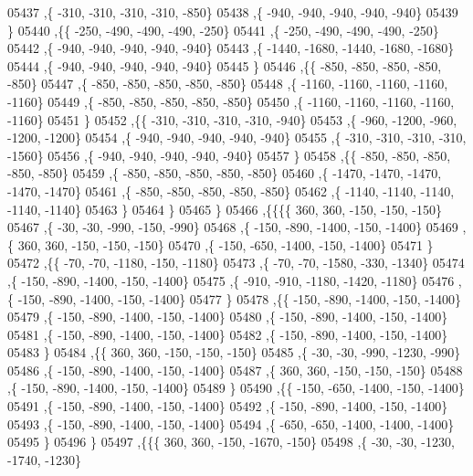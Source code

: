 \begin{DoxyCode}
05437     ,\{  -310,  -310,  -310,  -310,  -850\}
05438     ,\{  -940,  -940,  -940,  -940,  -940\}
05439     \}
05440    ,\{\{  -250,  -490,  -490,  -490,  -250\}
05441     ,\{  -250,  -490,  -490,  -490,  -250\}
05442     ,\{  -940,  -940,  -940,  -940,  -940\}
05443     ,\{ -1440, -1680, -1440, -1680, -1680\}
05444     ,\{  -940,  -940,  -940,  -940,  -940\}
05445     \}
05446    ,\{\{  -850,  -850,  -850,  -850,  -850\}
05447     ,\{  -850,  -850,  -850,  -850,  -850\}
05448     ,\{ -1160, -1160, -1160, -1160, -1160\}
05449     ,\{  -850,  -850,  -850,  -850,  -850\}
05450     ,\{ -1160, -1160, -1160, -1160, -1160\}
05451     \}
05452    ,\{\{  -310,  -310,  -310,  -310,  -940\}
05453     ,\{  -960, -1200,  -960, -1200, -1200\}
05454     ,\{  -940,  -940,  -940,  -940,  -940\}
05455     ,\{  -310,  -310,  -310,  -310, -1560\}
05456     ,\{  -940,  -940,  -940,  -940,  -940\}
05457     \}
05458    ,\{\{  -850,  -850,  -850,  -850,  -850\}
05459     ,\{  -850,  -850,  -850,  -850,  -850\}
05460     ,\{ -1470, -1470, -1470, -1470, -1470\}
05461     ,\{  -850,  -850,  -850,  -850,  -850\}
05462     ,\{ -1140, -1140, -1140, -1140, -1140\}
05463     \}
05464    \}
05465   \}
05466  ,\{\{\{\{   360,   360,  -150,  -150,  -150\}
05467     ,\{   -30,   -30,  -990,  -150,  -990\}
05468     ,\{  -150,  -890, -1400,  -150, -1400\}
05469     ,\{   360,   360,  -150,  -150,  -150\}
05470     ,\{  -150,  -650, -1400,  -150, -1400\}
05471     \}
05472    ,\{\{   -70,   -70, -1180,  -150, -1180\}
05473     ,\{   -70,   -70, -1580,  -330, -1340\}
05474     ,\{  -150,  -890, -1400,  -150, -1400\}
05475     ,\{  -910,  -910, -1180, -1420, -1180\}
05476     ,\{  -150,  -890, -1400,  -150, -1400\}
05477     \}
05478    ,\{\{  -150,  -890, -1400,  -150, -1400\}
05479     ,\{  -150,  -890, -1400,  -150, -1400\}
05480     ,\{  -150,  -890, -1400,  -150, -1400\}
05481     ,\{  -150,  -890, -1400,  -150, -1400\}
05482     ,\{  -150,  -890, -1400,  -150, -1400\}
05483     \}
05484    ,\{\{   360,   360,  -150,  -150,  -150\}
05485     ,\{   -30,   -30,  -990, -1230,  -990\}
05486     ,\{  -150,  -890, -1400,  -150, -1400\}
05487     ,\{   360,   360,  -150,  -150,  -150\}
05488     ,\{  -150,  -890, -1400,  -150, -1400\}
05489     \}
05490    ,\{\{  -150,  -650, -1400,  -150, -1400\}
05491     ,\{  -150,  -890, -1400,  -150, -1400\}
05492     ,\{  -150,  -890, -1400,  -150, -1400\}
05493     ,\{  -150,  -890, -1400,  -150, -1400\}
05494     ,\{  -650,  -650, -1400, -1400, -1400\}
05495     \}
05496    \}
05497   ,\{\{\{   360,   360,  -150, -1670,  -150\}
05498     ,\{   -30,   -30, -1230, -1740, -1230\}

\end{DoxyCode}
